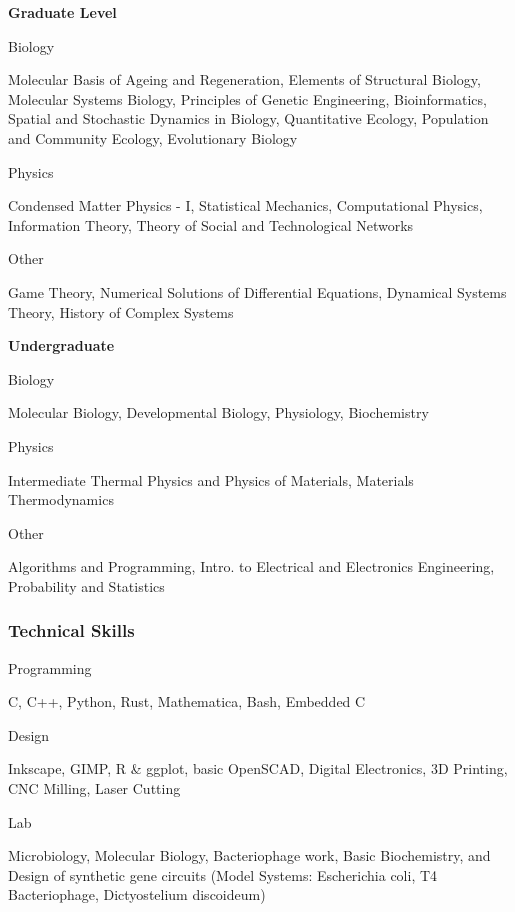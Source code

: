 \documentclass[
  letterpaper,
  DIV=11,
  numbers=noendperiod]{scrartcl}
\begin{document}
\textbf{Graduate Level}

Biology

Molecular Basis of Ageing and Regeneration, Elements of Structural
Biology, Molecular Systems Biology, Principles of Genetic Engineering,
Bioinformatics, Spatial and Stochastic Dynamics in Biology, Quantitative
Ecology, Population and Community Ecology, Evolutionary Biology

Physics

Condensed Matter Physics - I, Statistical Mechanics, Computational
Physics, Information Theory, Theory of Social and Technological Networks

Other

Game Theory, Numerical Solutions of Differential Equations, Dynamical
Systems Theory, History of Complex Systems

\textbf{Undergraduate}

Biology

Molecular Biology, Developmental Biology, Physiology, Biochemistry

Physics

Intermediate Thermal Physics and Physics of Materials, Materials
Thermodynamics

Other

Algorithms and Programming, Intro. to Electrical and Electronics
Engineering, Probability and Statistics

\subsubsection{Technical Skills}\label{technical-skills}

Programming

C, C++, Python, Rust, Mathematica, Bash, Embedded C

Design

Inkscape, GIMP, R \& ggplot, basic OpenSCAD, Digital Electronics, 3D
Printing, CNC Milling, Laser Cutting

Lab

Microbiology, Molecular Biology, Bacteriophage work, Basic Biochemistry,
and Design of synthetic gene circuits (Model Systems: Escherichia coli,
T4 Bacteriophage, Dictyostelium discoideum)
\end{document}
